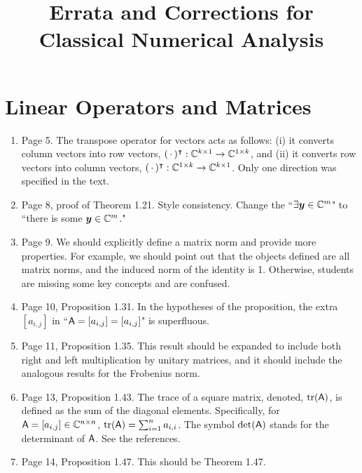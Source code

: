 \documentclass{book}
\title{Errata and Corrections for Classical Numerical Analysis}
\begin{document}
	\maketitle

	\chapter{Linear Operators and Matrices}

	\begin{enumerate}
	\item 
Page 5. The transpose operator for vectors acts as follows: (i) it converts column vectors into row vectors, $(\, \cdot \, )^\intercal: \mathbb C^{k\times 1} \to \mathbb C^{1\times k}$, and (ii) it converts row vectors into column vectors, $(\, \cdot \, )^\intercal: \mathbb C^{1\times k} \to \mathbb C^{k\times 1}$. Only one direction was specified in the text.

	\item
Page 8, proof of Theorem 1.21. Style consistency. Change the ``$\exists \boldsymbol{y}\in\mathbb C^m$" to ``there is some $\boldsymbol{y}\in\mathbb C^m$."
	
	\item
Page 9. We should explicitly define a matrix norm and provide more properties. For example, we should point out that the objects defined are all matrix norms, and the induced norm of the identity is 1. Otherwise, students are missing some key concepts and are confused.

	\item
Page 10, Proposition 1.31. In the hypotheses of the proposition, the extra $[a_{i,j}]$ in ``$\mathsf{A} = [a_{i,j}]=[a_{i,j}]$" is superfluous.

	\item
Page 11, Proposition 1.35. This result should be expanded to include both right and left multiplication by unitary matrices, and it should include the analogous results for the Frobenius norm.

	\item
Page 13, Proposition 1.43. The trace of a square matrix, denoted, ${\rm tr}(\mathsf{A})$, is defined as the sum of the diagonal elements. Specifically, for $\mathsf{A} = [a_{i,j}]\in\mathbb C^{n\times n}$, ${\rm tr}(\mathsf{A}) = \sum_{i=1}^n a_{i,i}$. The symbol $\det(\mathsf{A})$ stands for the determinant of $\mathsf{A}$. See the references.

	\item
Page 14, Proposition 1.47. This should be Theorem 1.47.


\end{enumerate}
\end{document}
